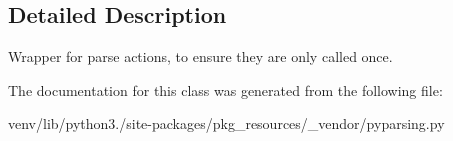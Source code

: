 \subsection{Detailed Description}
\begin{DoxyVerb}Wrapper for parse actions, to ensure they are only called once.
\end{DoxyVerb}
 

The documentation for this class was generated from the following file\+:\begin{DoxyCompactItemize}
\item 
venv/lib/python3./site-\/packages/pkg\+\_\+resources/\+\_\+vendor/pyparsing.\+py\end{DoxyCompactItemize}
